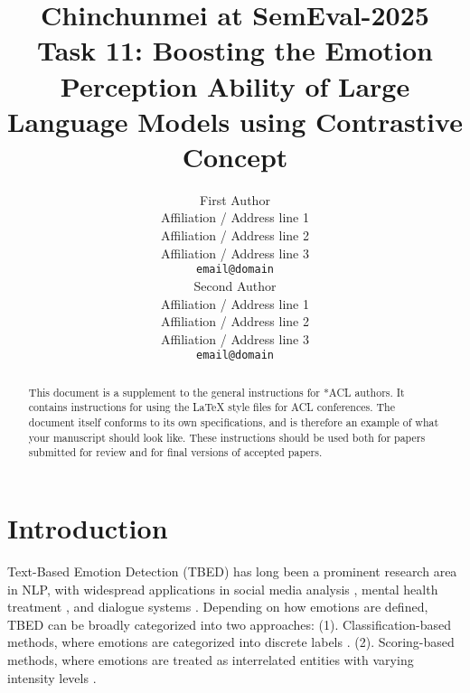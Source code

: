 \documentclass[11pt]{article}
\title{Chinchunmei at SemEval-2025 Task 11: Boosting the Emotion Perception Ability of Large Language Models using Contrastive Concept}
\author{First Author \\
  Affiliation / Address line 1 \\
  Affiliation / Address line 2 \\
  Affiliation / Address line 3 \\
  \texttt{email@domain} \\\And
  Second Author \\
  Affiliation / Address line 1 \\
  Affiliation / Address line 2 \\
  Affiliation / Address line 3 \\
  \texttt{email@domain} \\}
\begin{document}
\maketitle
\begin{abstract}
This document is a supplement to the general instructions for *ACL authors. It contains instructions for using the \LaTeX{} style files for ACL conferences.
The document itself conforms to its own specifications, and is therefore an example of what your manuscript should look like.
These instructions should be used both for papers submitted for review and for final versions of accepted papers.
\end{abstract}

\section{Introduction}
\iffalse
These instructions are for authors submitting papers to *ACL conferences using \LaTeX. They are not self-contained. All authors must follow the general instructions for *ACL proceedings,\footnote{\url{http://acl-org.github.io/ACLPUB/formatting.html}} and this document contains additional instructions for the \LaTeX{} style files.

The templates include the \LaTeX{} source of this document (\texttt{acl\_latex.tex}),
the \LaTeX{} style file used to format it (\texttt{acl.sty}),
an ACL bibliography style (\texttt{acl\_natbib.bst}),
an example bibliography (\texttt{custom.bib}),
and the bibliography for the ACL Anthology (\texttt{anthology.bib}).
\fi


Text-Based Emotion Detection (TBED) has long been a prominent research area in NLP, with widespread applications in social media analysis \cite{kuamri2017real, salam2018emotion, cassab2020ontology}, mental health treatment \cite{kusal2021ai, krommyda2021experimental}, and dialogue systems \cite{liu2022dialogueein,ide2022building,hu2021dialoguecrn}. Depending on how emotions are defined, TBED can be broadly categorized into two approaches: (1). Classification-based methods, where emotions are categorized into discrete labels \cite{ekman1969repertoire,plutchik1982psycho}. (2). Scoring-based methods, where emotions are treated as interrelated entities with varying intensity levels \cite{russell1977evidence}. 
\end{document}
